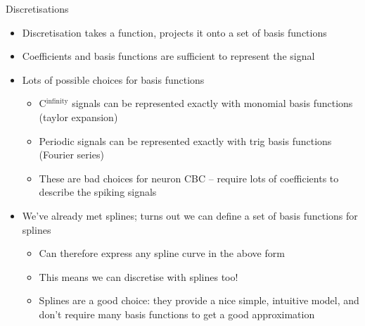 \documentclass[presentation]{beamer}
\begin{document}
\begin{frame}[plain,label={sec:orgace675d}]{Discretisations}
\begin{itemize}
\item Discretisation takes a function, projects it onto a set of basis functions
\item Coefficients and basis functions are sufficient to represent the signal
\item Lots of possible choices for basis functions
\begin{itemize}
\item C\(^{\text{infinity}}\) signals can be represented exactly with monomial basis functions (taylor expansion)
\item Periodic signals can be represented exactly with trig basis functions (Fourier series)
\item These are bad choices for neuron CBC -- require lots of coefficients to describe the spiking signals
\end{itemize}
\item We've already met splines; turns out we can define a set of basis functions for splines
\begin{itemize}
\item Can therefore express any spline curve in the above form
\item This means we can discretise with splines too!
\item Splines are a good choice: they provide a nice simple, intuitive model, and don't require many basis functions to get a good approximation
\end{itemize}
\end{itemize}
\end{frame}
\end{document}
